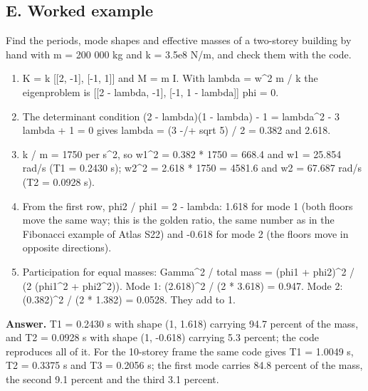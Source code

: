 \documentclass[11pt,a4paper]{article}
\begin{document}
\subsection*{E. Worked example}
Find the periods, mode shapes and effective masses of a two-storey building by hand with m = 200 000 kg and k = 3.5e8 N/m, and check them with the code.
\begin{enumerate}[nosep]
\item K = k [[2, -1], [-1, 1]] and M = m I. With lambda = w\textasciicircum{}2 m / k the eigenproblem is [[2 - lambda, -1], [-1, 1 - lambda]] phi = 0.
\item The determinant condition (2 - lambda)(1 - lambda) - 1 = lambda\textasciicircum{}2 - 3 lambda + 1 = 0 gives lambda = (3 -/+ sqrt 5) / 2 = 0.382 and 2.618.
\item k / m = 1750 per s\textasciicircum{}2, so w1\textasciicircum{}2 = 0.382 * 1750 = 668.4 and w1 = 25.854 rad/s (T1 = 0.2430 s); w2\textasciicircum{}2 = 2.618 * 1750 = 4581.6 and w2 = 67.687 rad/s (T2 = 0.0928 s).
\item From the first row, phi2 / phi1 = 2 - lambda: 1.618 for mode 1 (both floors move the same way; this is the golden ratio, the same number as in the Fibonacci example of Atlas S22) and -0.618 for mode 2 (the floors move in opposite directions).
\item Participation for equal masses: Gamma\textasciicircum{}2 / total mass = (phi1 + phi2)\textasciicircum{}2 / (2 (phi1\textasciicircum{}2 + phi2\textasciicircum{}2)). Mode 1: (2.618)\textasciicircum{}2 / (2 * 3.618) = 0.947. Mode 2: (0.382)\textasciicircum{}2 / (2 * 1.382) = 0.0528. They add to 1.
\end{enumerate}
\textbf{Answer.} T1 = 0.2430 s with shape (1, 1.618) carrying 94.7 percent of the mass, and T2 = 0.0928 s with shape (1, -0.618) carrying 5.3 percent; the code reproduces all of it. For the 10-storey frame the same code gives T1 = 1.0049 s, T2 = 0.3375 s and T3 = 0.2056 s; the first mode carries 84.8 percent of the mass, the second 9.1 percent and the third 3.1 percent.
\end{document}

